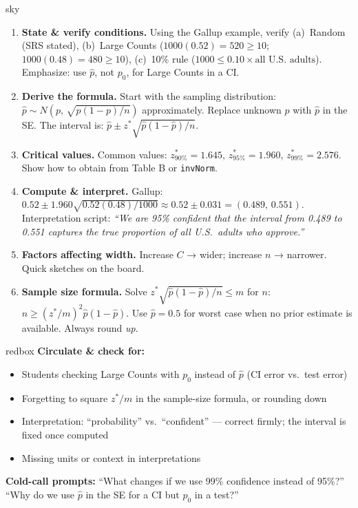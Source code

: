 \documentclass[10pt]{article}
\begin{document}
\begin{skillbox}[Lesson]{sky}
    \begin{enumerate}[leftmargin=1.4em, label=\arabic*.]
        \item \textbf{State \& verify conditions.} Using the Gallup example, verify (a)~Random
              (SRS stated), (b)~Large Counts ($1000(0.52)=520\ge10$; $1000(0.48)=480\ge10$),
              (c)~10\% rule ($1000 \le 0.10 \times \text{all U.S.\ adults}$). Emphasize: use
              $\hat p$, not $p_0$, for Large Counts in a CI.

        \item \textbf{Derive the formula.} Start with the sampling distribution:
              $\hat p \sim N\!\left(p,\,\sqrt{p(1-p)/n}\right)$ approximately. Replace unknown $p$
              with $\hat p$ in the SE. The interval is: $\hat p \pm z^*\sqrt{\hat p(1-\hat p)/n}$.

        \item \textbf{Critical values.} Common values: $z^*_{90\%}=1.645$, $z^*_{95\%}=1.960$,
              $z^*_{99\%}=2.576$. Show how to obtain from Table B or \texttt{invNorm}.

        \item \textbf{Compute \& interpret.} Gallup: $0.52 \pm 1.960\sqrt{0.52(0.48)/1000}
              \approx 0.52 \pm 0.031 = (0.489,\,0.551)$. Interpretation script:
              \textit{``We are 95\% confident that the interval from 0.489 to 0.551
              captures the true proportion of all U.S.\ adults who approve.''}

        \item \textbf{Factors affecting width.} Increase $C$ → wider; increase $n$ → narrower.
              Quick sketches on the board.

        \item \textbf{Sample size formula.} Solve $z^*\sqrt{\hat p(1-\hat p)/n} \le m$ for $n$:
              $n \ge \left(z^*/m\right)^2\!\hat p(1-\hat p)$. Use $\hat p = 0.5$ for worst case
              when no prior estimate is available. Always round \emph{up}.
    \end{enumerate}
\end{skillbox}

\begin{skillbox}{redbox}
    \textbf{Circulate \& check for:}
    \begin{itemize}[leftmargin=1.2em]
        \item Students checking Large Counts with $p_0$ instead of $\hat p$ (CI error vs.\ test error)
        \item Forgetting to square $z^*/m$ in the sample-size formula, or rounding down
        \item Interpretation: ``probability'' vs.\ ``confident'' --- correct firmly; the interval is fixed once computed
        \item Missing units or context in interpretations
    \end{itemize}
    \textbf{Cold-call prompts:} ``What changes if we use 99\% confidence instead of 95\%?'' \quad
    ``Why do we use $\hat p$ in the SE for a CI but $p_0$ in a test?''
\end{skillbox}
\end{document}
